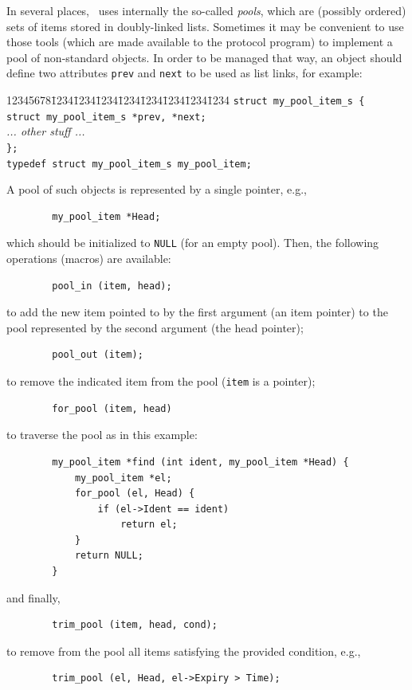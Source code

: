 In several places, \smurph\ uses internally the so-called {\em pools}, which
are (possibly ordered) sets of items stored in doubly-linked lists.
Sometimes it may be convenient to use those tools (which are made available
to the protocol program) to implement a pool of non-standard objects.
In order to be managed that way, an object should define two attributes
{\tt prev} and {\tt next} to be used as list links, for example:
{\tt\begin{tabbing}
12345678\=1234\=1234\=1234\=1234\=1234\=1234\=1234\=1234\kill
\> {\tt struct my\_pool\_item\_s \{ }\\
\>\> {\tt struct my\_pool\_item\_s *prev, *next; }\\
\>\> {\em ... other stuff ...}\\
\> {\tt \};}\\
\> {\tt typedef struct my\_pool\_item\_s my\_pool\_item; }
\end{tabbing}}
\noindent
A pool of such objects is represented by a single pointer, e.g.,
\begin{verbatim}
        my_pool_item *Head;
\end{verbatim}
which should be initialized to {\tt NULL} (for an empty pool).
Then, the following operations (macros) are available:
\begin{verbatim}
        pool_in (item, head);
\end{verbatim}
\noindent
to add the new item pointed to by the first argument (an item pointer)
to the pool represented by the second argument (the head pointer);

\begin{verbatim}
        pool_out (item);
\end{verbatim}
\noindent
to remove the indicated item from the pool ({\tt item} is a pointer);

\begin{verbatim}
        for_pool (item, head)
\end{verbatim}
to traverse the pool as in this example:
\begin{verbatim}
        my_pool_item *find (int ident, my_pool_item *Head) {
            my_pool_item *el;
            for_pool (el, Head) {
                if (el->Ident == ident)
                    return el;
            }
            return NULL;
        }
\end{verbatim}
\noindent
and finally,
\begin{verbatim}
        trim_pool (item, head, cond);
\end{verbatim}
\noindent
to remove from the pool all items satisfying the provided condition, e.g.,
\begin{verbatim}
        trim_pool (el, Head, el->Expiry > Time);
\end{verbatim}

